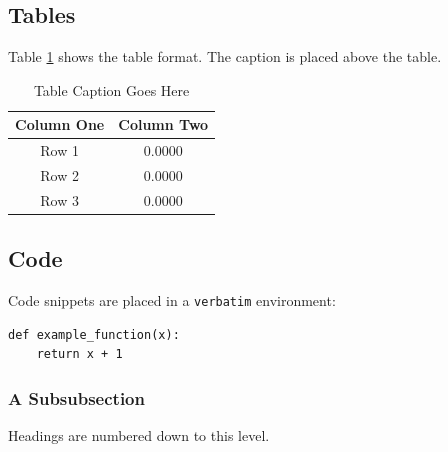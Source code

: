 \subsection{Tables}

Table \ref{table:example} shows the table format. The caption is placed above the table.

\begin{table}[H]
\caption{Table Caption Goes Here}
\centering
\begin{tabular}{cc}
\toprule
\textbf{Column One} & \textbf{Column Two} \\
\midrule
Row 1 & 0.0000 \\
Row 2 & 0.0000 \\
Row 3 & 0.0000 \\
\bottomrule
\end{tabular}
\label{table:example}
\end{table}

\subsection{Code}

Code snippets are placed in a \texttt{verbatim} environment:

\begin{verbatim}
def example_function(x):
    return x + 1
\end{verbatim}

\subsubsection{A Subsubsection}

Headings are numbered down to this level.


\newpage
